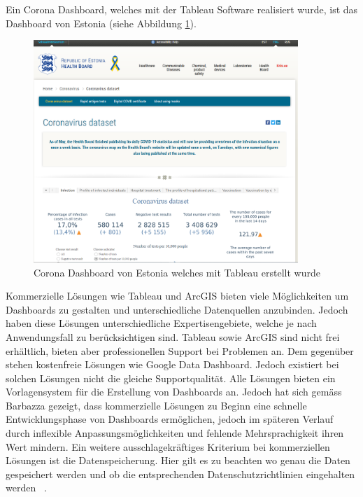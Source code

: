 Ein Corona Dashboard, welches mit der Tableau Software realisiert wurde, ist das Dashboard von Estonia (siehe Abbildung \ref{fig:tableau_dashboard}).

\begin{figure}[h]
    \includegraphics[width=10cm]{images/tableau_dashboard.png}
    \centering
    \caption{Corona Dashboard von Estonia welches mit Tableau erstellt wurde ~\citep{tableau_dashboard}}
    \label{fig:tableau_dashboard}
\end{figure}

Kommerzielle Lösungen wie Tableau und ArcGIS bieten viele Möglichkeiten um Dashboards zu gestalten und unterschiedliche Datenquellen anzubinden. Jedoch haben diese Lösungen unterschiedliche Expertisengebiete, welche je nach Anwendungsfall zu berücksichtigen sind. Tableau sowie ArcGIS sind nicht frei erhältlich, bieten aber professionellen Support bei Problemen an. Dem gegenüber stehen kostenfreie Lösungen wie Google Data Dashboard. Jedoch existiert bei solchen Lösungen nicht die gleiche Supportqualität. Alle Lösungen bieten ein Vorlagensystem für die Erstellung von Dashboards an. Jedoch hat sich gemäss Barbazza gezeigt, dass kommerzielle Lösungen zu Beginn eine schnelle Entwicklungsphase von Dashboards ermöglichen, jedoch im späteren Verlauf durch inflexible Anpassungsmöglichkeiten und fehlende Mehrsprachigkeit ihren Wert mindern. Ein weitere ausschlagekräftiges Kriterium bei kommerziellen Lösungen ist die Datenspeicherung. Hier gilt es zu beachten wo genau die Daten gespeichert werden und ob die entsprechenden Datenschutzrichtlinien eingehalten werden ~\citep[S. 9]{barbazza}.

